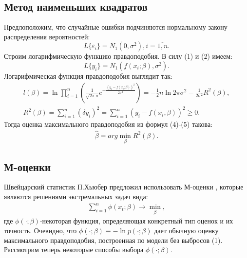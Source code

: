 \documentclass[12pt]{article}
\begin{document}
\subsection{Метод наименьших квадратов}
Предлоположим, что случайные ошибки подчиняются нормальному закону распределения вероятностей:
\begin{equation}
    L\{\varepsilon_i\}=N_1(0,\sigma^2), i = \overline{1,n}.
\end{equation}
Строим логарифмическую функцию правдоподобия. В силу (1) и (2) имеем:
\begin{equation}
    L\{y_i\}=N_1(f(x_i;\beta), \sigma^2).
\end{equation}
Логарифмическая функция правдоподобия выглядит так\cite{Kharin}:
\begin{eqnarray}
    l(\beta)=\ln \prod_{i=1}^{n}(\frac{1}{\sqrt{2\pi}\sigma}e^{-\frac{(y_i-f(x_i;\beta))^2}{2\sigma^2}})=-\frac{1}{2}n\ln{2\pi\sigma^2}-\frac{1}{2\sigma^2}R^2(\beta),\\
    R^2(\beta)=\sum_{i=1}^{n}(\delta y_i)^2=\sum_{i=1}^{n}(y_i-f(x_i,\beta))^2\geq 0.
\end{eqnarray}
Тогда оценка максимального правдоподобия из формул (4)-(5) такова:
\begin{eqnarray}
    \hat{\beta}=arg \min_{\beta}R^2(\beta).
\end{eqnarray}

\subsection{М-оценки}
Швейцарский статистик П.Хьюбер предложил использовать М-оценки \cite{Kharin}, которые являются решениями экстремальных задач вида:
\begin{eqnarray}
    \sum_{i=1}^{n}\phi(x_t;\beta)\rightarrow \min_{\beta},
\end{eqnarray}
где $\phi(\cdot;\beta)$-некоторая функция, определяющая конкретный тип оценок и их точность.\hfill\break
Очевидно, что $\phi(\cdot;\beta)\equiv - \ln{p(\cdot;\beta)}$ дает обычную оценку максимального правдоподобия, построенная по модели без выбросов (1).\hfill\break
Рассмотрим теперь некоторые способы выбора $\phi(\cdot;\beta)$.\hfill\break
\end{document}
